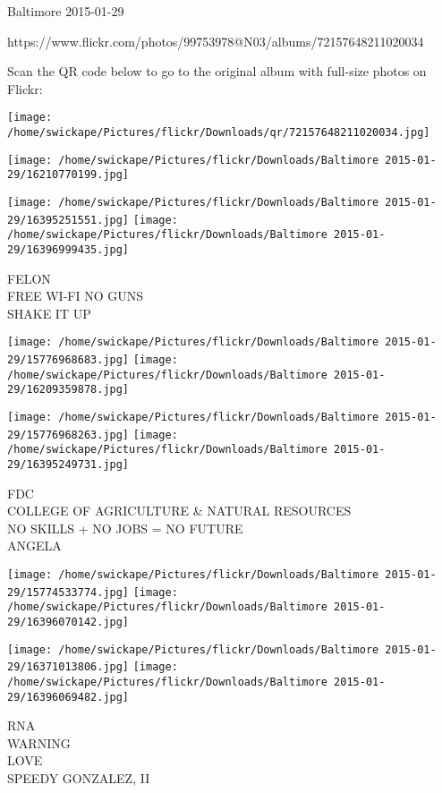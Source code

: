 \documentclass[10pt,letterpaper]{article}
\begin{document}
Baltimore 2015-01-29

https://www.flickr.com/photos/99753978@N03/albums/72157648211020034

Scan the QR code below to go to the original album with full-size photos on Flickr:

\texttt{[image: /home/swickape/Pictures/flickr/Downloads/qr/72157648211020034.jpg]}
\pagebreak

\texttt{[image: /home/swickape/Pictures/flickr/Downloads/Baltimore 2015-01-29/16210770199.jpg]}

\vspace{0.25in}
\texttt{[image: /home/swickape/Pictures/flickr/Downloads/Baltimore 2015-01-29/16395251551.jpg]}
\texttt{[image: /home/swickape/Pictures/flickr/Downloads/Baltimore 2015-01-29/16396999435.jpg]}

FELON\\
FREE WI{-}FI NO GUNS\\
SHAKE IT UP\\
\pagebreak

\texttt{[image: /home/swickape/Pictures/flickr/Downloads/Baltimore 2015-01-29/15776968683.jpg]}
\texttt{[image: /home/swickape/Pictures/flickr/Downloads/Baltimore 2015-01-29/16209359878.jpg]}

\texttt{[image: /home/swickape/Pictures/flickr/Downloads/Baltimore 2015-01-29/15776968263.jpg]}
\texttt{[image: /home/swickape/Pictures/flickr/Downloads/Baltimore 2015-01-29/16395249731.jpg]}

FDC\\
COLLEGE OF AGRICULTURE \& NATURAL RESOURCES\\
NO SKILLS + NO JOBS = NO FUTURE\\
ANGELA\\
\pagebreak

\texttt{[image: /home/swickape/Pictures/flickr/Downloads/Baltimore 2015-01-29/15774533774.jpg]}
\texttt{[image: /home/swickape/Pictures/flickr/Downloads/Baltimore 2015-01-29/16396070142.jpg]}

\texttt{[image: /home/swickape/Pictures/flickr/Downloads/Baltimore 2015-01-29/16371013806.jpg]}
\texttt{[image: /home/swickape/Pictures/flickr/Downloads/Baltimore 2015-01-29/16396069482.jpg]}

RNA\\
WARNING\\
LOVE\\
SPEEDY GONZALEZ, II\\
\pagebreak
\end{document}
